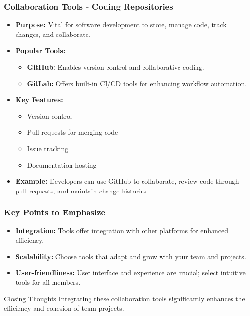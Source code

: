 \documentclass[aspectratio=169]{beamer}
\begin{document}
\begin{frame}[fragile]
    \frametitle{Collaboration Tools - Coding Repositories}
    \begin{itemize}
        \item \textbf{Purpose:} Vital for software development to store, manage code, track changes, and collaborate.
        
        \item \textbf{Popular Tools:}
            \begin{itemize}
                \item \textbf{GitHub:} Enables version control and collaborative coding.
                \item \textbf{GitLab:} Offers built-in CI/CD tools for enhancing workflow automation.
            \end{itemize}
        
        \item \textbf{Key Features:}
            \begin{itemize}
                \item Version control
                \item Pull requests for merging code
                \item Issue tracking
                \item Documentation hosting
            \end{itemize}
        
        \item \textbf{Example:} Developers can use GitHub to collaborate, review code through pull requests, and maintain change histories.
    \end{itemize}
\end{frame}

\begin{frame}[fragile]
    \frametitle{Key Points to Emphasize}
    \begin{itemize}
        \item \textbf{Integration:} Tools offer integration with other platforms for enhanced efficiency.
        \item \textbf{Scalability:} Choose tools that adapt and grow with your team and projects.
        \item \textbf{User-friendliness:} User interface and experience are crucial; select intuitive tools for all members.
    \end{itemize}
    \begin{block}{Closing Thoughts}
        Integrating these collaboration tools significantly enhances the efficiency and cohesion of team projects.
    \end{block}
\end{frame}
\end{document}

